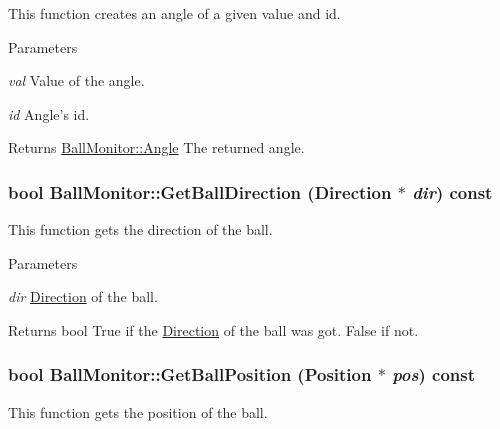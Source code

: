 This function creates an angle of a given value and id. 


\begin{DoxyParams}{Parameters}
\item[{\em val}]Value of the angle. \item[{\em id}]Angle's id. \end{DoxyParams}
\begin{DoxyReturn}{Returns}
\hyperlink{structBallMonitor_1_1Angle}{BallMonitor::Angle} The returned angle. 
\end{DoxyReturn}
\hypertarget{classBallMonitor_a3cd2fe1ed297c468634fbb390ca088bd}{
\subsubsection[{GetBallDirection}]{\setlength{\rightskip}{0pt plus 5cm}bool BallMonitor::GetBallDirection ({\bf Direction} $\ast$ {\em dir}) const}}
\label{classBallMonitor_a3cd2fe1ed297c468634fbb390ca088bd}


This function gets the direction of the ball. 


\begin{DoxyParams}{Parameters}
\item[{\em dir}]\hyperlink{structBallMonitor_1_1Direction}{Direction} of the ball. \end{DoxyParams}
\begin{DoxyReturn}{Returns}
bool True if the \hyperlink{structBallMonitor_1_1Direction}{Direction} of the ball was got. False if not. 
\end{DoxyReturn}
\hypertarget{classBallMonitor_aab81815271c442087c15bc8f6843d092}{
\subsubsection[{GetBallPosition}]{\setlength{\rightskip}{0pt plus 5cm}bool BallMonitor::GetBallPosition (Position $\ast$ {\em pos}) const}}
\label{classBallMonitor_aab81815271c442087c15bc8f6843d092}


This function gets the position of the ball. 


